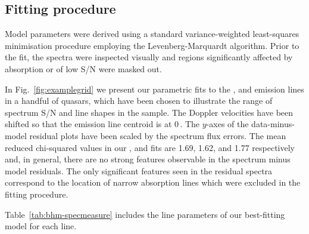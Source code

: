 \subsection{Fitting procedure}

Model parameters were derived using a standard variance-weighted least-squares minimisation procedure employing the Levenberg-Marquardt algorithm. 
Prior to the fit, the spectra were inspected visually and regions significantly affected by absorption or of low S/N were masked out.

In Fig.~\ref{fig:examplegrid} we present our parametric fits to the , \ha and \hb emission lines in a handful of quasars, which have been chosen to illustrate the range of spectrum S/N and line shapes in the sample.  
The Doppler velocities have been shifted so that the \ha emission line centroid is at 0\,\kms. 
The $y$-axes of the data-minus-model residual plots have been scaled by the spectrum flux errors.
The mean reduced chi-squared values in our \hans, \hb and  fits are 1.69, 1.62, and 1.77 respectively and, in general, there are no strong features observable in the spectrum minus model residuals. 
The only significant features seen in the residual  spectra correspond to the location of narrow absorption lines which were excluded in the fitting procedure.

Table~\ref{tab:bhm-specmeasure} includes the line parameters of our best-fitting model for each line.

